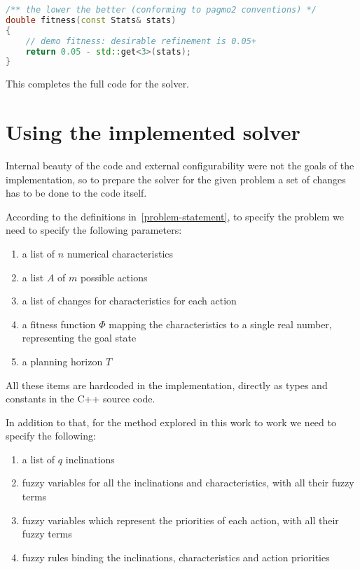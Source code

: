 \documentclass[12pt, a4paper]{report}
\begin{document}
	\begin{lstlisting}[language=c++]
/** the lower the better (conforming to pagmo2 conventions) */
double fitness(const Stats& stats)
{
	// demo fitness: desirable refinement is 0.05+
	return 0.05 - std::get<3>(stats);
}
	\end{lstlisting}

	This completes the full code for the solver.
	
	\section{Using the implemented solver}
	
	Internal beauty of the code and external configurability were not the goals of the implementation, so to prepare the solver for the given problem a set of changes has to be done to the code itself.
	
	According to the definitions in~\ref{problem-statement}, to specify the problem we need to specify the following parameters:
	
	\begin{enumerate}
		\item a list of $n$ numerical characteristics
		\item a list $A$ of $m$ possible actions
		\item a list of changes for characteristics for each action
		\item a fitness function $\Phi$ mapping the characteristics to a single real number, representing the goal state
		\item a planning horizon $T$
	\end{enumerate}
	
	All these items are hardcoded in the implementation, directly as types and constants in the C++ source code.
	
	In addition to that, for the method explored in this work to work we need to specify the following:
	
	\begin{enumerate}
		\item a list of $q$ inclinations
		\item fuzzy variables for all the inclinations and characteristics, with all their fuzzy terms
		\item fuzzy variables which represent the priorities of each action, with all their fuzzy terms
		\item fuzzy rules binding the inclinations, characteristics and action priorities
	\end{enumerate}
\end{document}
